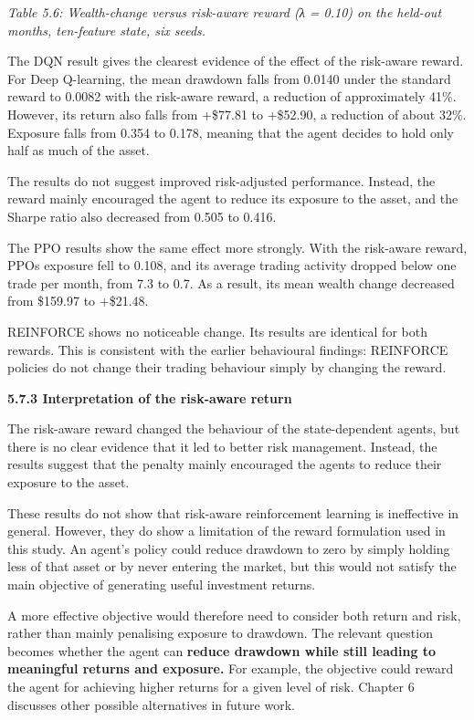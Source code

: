 \emph{Table 5.6: Wealth-change versus risk-aware reward (λ = 0.10) on
the held-out months, ten-feature state, six seeds.}

The DQN result gives the clearest evidence of the effect of the
risk-aware reward. For Deep Q-learning, the mean drawdown falls from
0.0140 under the standard reward to 0.0082 with the risk-aware reward, a
reduction of approximately 41\%. However, its return also falls from
+\$77.81 to +\$52.90, a reduction of about 32\%. Exposure falls from
0.354 to 0.178, meaning that the agent decides to hold only half as much
of the asset.

The results do not suggest improved risk-adjusted performance. Instead,
the reward mainly encouraged the agent to reduce its exposure to the
asset, and the Sharpe ratio also decreased from 0.505 to 0.416.

The PPO results show the same effect more strongly. With the risk-aware
reward, PPO\textquotesingle s exposure fell to 0.108, and its average
trading activity dropped below one trade per month, from 7.3 to 0.7. As
a result, its mean wealth change decreased from \$159.97 to +\$21.48.

REINFORCE shows no noticeable change. Its results are identical for both
rewards. This is consistent with the earlier behavioural findings:
REINFORCE policies do not change their trading behaviour simply by
changing the reward.

\textbf{5.7.3 Interpretation of the risk-aware return}

The risk-aware reward changed the behaviour of the state-dependent
agents, but there is no clear evidence that it led to better risk
management. Instead, the results suggest that the penalty mainly
encouraged the agents to reduce their exposure to the asset.

These results do not show that risk-aware reinforcement learning is
ineffective in general. However, they do show a limitation of the reward
formulation used in this study. An agent's policy could reduce drawdown
to zero by simply holding less of that asset or by never entering the
market, but this would not satisfy the main objective of generating
useful investment returns.

A more effective objective would therefore need to consider both return
and risk, rather than mainly penalising exposure to drawdown. The
relevant question becomes whether the agent can \textbf{reduce drawdown
while still leading to meaningful returns and exposure.} For example,
the objective could reward the agent for achieving higher returns for a
given level of risk. Chapter 6 discusses other possible alternatives in
future work.

